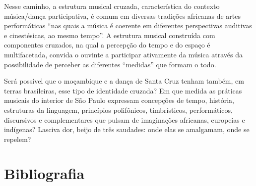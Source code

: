 Nesse caminho, a estrutura musical cruzada, característica do contexto
música/dança participativa, é comum em diversas tradições africanas de
artes performáticas ``nas quais a música é coerente em diferentes
perspectivas auditivas e cinestésicas, ao mesmo tempo''. A estrutura
musical construída com componentes cruzados, na qual a percepção do
tempo e do espaço é multifacetada, convida o ouvinte a participar
ativamente da música através da possibilidade de perceber as diferentes
``medidas'' que formam o todo.

Será possível que o moçambique e a dança de Santa Cruz tenham também, em
terras brasileiras, esse tipo de identidade cruzada? Em que medida as
práticas musicais do interior de São Paulo expressam concepções de
tempo, história, estruturas da linguagem, princípios polifônicos,
timbrísticos, performáticos, discursivos e complementares que pulsam de
imaginações africanas, europeias e indígenas? Lasciva dor, beijo de três
saudades: onde elas se amalgamam, onde se repelem?

\section{Bibliografia}

